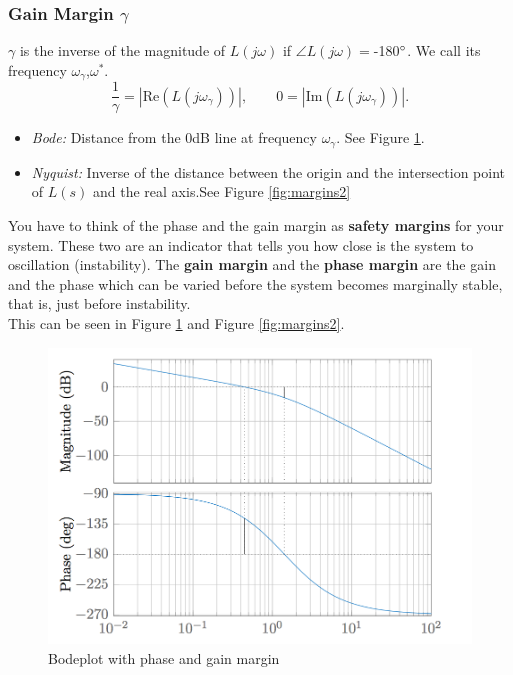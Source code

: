 \documentclass[a4paper,12 pt]{article}
\numberwithin{equation}{section}
\theoremstyle{definition}
\theoremstyle{remark}
\theoremstyle{definition}
\theoremstyle{definition}
\theoremstyle{definition}
\theoremstyle{remark}
\begin{document}
\subsubsection{Gain Margin $\gamma$}
$\gamma$ is the inverse of the magnitude of $L(j\omega)$ if $\angle L(j\omega)=$-180$\degree$. We call its frequency $\omega_{\gamma}$,$\omega^*$.
\begin{equation}
\frac{1}{\gamma}=| \text{Re}( L(j\omega_{\gamma}))|, \qquad 0=|\text{Im} (L(j\omega_{\gamma}))|.
\end{equation}
\begin{itemize}
\item \textit{Bode:} Distance from the 0dB line at frequency $\omega_\gamma$. See Figure \ref{fig:margins1}.
\item \textit{Nyquist:} Inverse of the distance between the origin and the intersection point of $L(s)$ and the real axis.See Figure \ref{fig:margins2}
\end{itemize}
You have to think of the phase and the gain margin as \textbf{safety margins} for your system. These two are an indicator that tells you how close is the system to oscillation (instability). The \textbf{gain margin} and the \textbf{phase margin} are the gain and the phase which can be varied before the system becomes marginally stable, that is, just before instability.\\ This can be seen in Figure \ref{fig:margins1} and Figure \ref{fig:margins2}.
\begin{figure}[h!]
\begin{center}
\includegraphics[width=0.7\columnwidth]{margins1.png}
\caption{Bodeplot with phase and gain margin}
\label{fig:margins1}
\end{center}
\end{figure}
\end{document}
